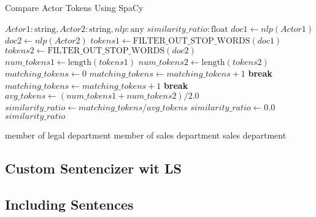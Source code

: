 \begin{algorithm}
    \caption{Compare Actor Tokens Using SpaCy}
    \label{}
    \begin{algorithmic}[1]
        \REQUIRE $Actor1: \text{string},  Actor2: \text{string}, nlp: \text{any}$
        \ENSURE $similarity\_ratio: \text{float}$
            \STATE $doc1 \gets nlp(Actor1)$
            \STATE $doc2 \gets nlp(Actor2)$
            \STATE $tokens1 \gets \text{FILTER\_OUT\_STOP\_WORDS}(doc1)$
            \STATE $tokens2 \gets \text{FILTER\_OUT\_STOP\_WORDS}(doc2)$
            \STATE $num\_tokens1 \gets \text{length}(tokens1)$
            \STATE $num\_tokens2 \gets \text{length}(tokens2)$
            \STATE $matching\_tokens \gets 0$
                            \STATE $matching\_tokens \gets matching\_tokens + 1$
                            \STATE \textbf{break}
                        \ENDIF
                    \ENDFOR
                \ENDFOR
            \ELSE
                            \STATE $matching\_tokens \gets matching\_tokens + 1$
                            \STATE \textbf{break}
                        \ENDIF
                    \ENDFOR
                \ENDFOR
            \ENDIF
            \STATE $avg\_tokens \gets (num\_tokens1 + num\_tokens2) / 2.0$
                \STATE $similarity\_ratio \gets matching\_tokens / avg\_tokens$
            \ELSE
                \STATE $similarity\_ratio \gets 0.0$
            \ENDIF
            \RETURN $similarity\_ratio$
    \end{algorithmic}
\end{algorithm}

member of legal department
member of sales department
sales department

\subsection{Custom Sentencizer wit LS}
\subsection{Including Sentences}
